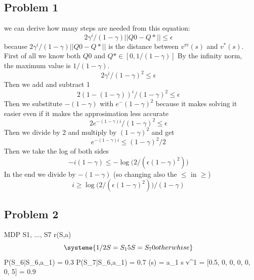 \documentclass[10pt,a4paper]{article}
\begin{document}
\subsection*{Problem 1}
we can derive how many steps are needed from this equation:
\begin{equation}  {2\gamma^i}/{(1-\gamma)}||Q0-Q*|| \leq \epsilon \end{equation}
because $ {2\gamma^i}/{(1-\gamma)}||Q0-Q*|| $ is the distance between $ v^{\pi i}(s) $ and $v^*(s) $. \newline
\newline
First of all we know both $Q0$ and $Q* \in [0, 1/(1-\gamma)]$ By the infinity norm, the maximum value is $ 1/(1-\gamma) $. 
\begin{equation}
{2\gamma^i}/{(1-\gamma)^2} \leq \epsilon
\end{equation}
Then we add and subtract 1 
\begin{equation}
    {2 (1 - (1 - \gamma))^i}/{(1-\gamma)^2} \leq \epsilon
\end{equation}
Then we substitute $ - (1 - \gamma) $ with $e^- (1 - \gamma)^2 $ because it makes solving it easier even if it makes the approsimation less accurate
\begin{equation}
    {2e^{-(1 - \gamma )i}}/{(1-\gamma)^2} \leq \epsilon
\end{equation}
Then we divide by 2 and multiply by $ {(1-\gamma)^2} $ and get 
\begin{equation}
e^{-(1 - \gamma )i} \leq  {(1-\gamma)^2}/2
\end{equation}
Then we take the log of both sides 
\begin{equation}
    -i(1 - \gamma ) \leq  -\log({2/(\epsilon(1-\gamma)^2))}
\end{equation}
In the end we divide by $ -(1 - \gamma ) $ (so changing also the $\leq$ in $\geq$)
\begin{equation}
    i \geq  \log({2/(\epsilon(1-\gamma)^2))}/(1 - \gamma ) 
\end{equation}

\newpage
\subsection*{Problem 2}
MDP \newline
S1, ..., S7
r(S,a)\begin{equation}
    \systeme{
      1/2 S = S_{1}
      5 S = S_{7}
      0 otherwhise
    }
\end{equation}
\newline
P(S_{6}|S_{6},a_{1}) = 0.3
P(S_{7}|S_{6},a_{1}) = 0.7
\newline
\pi(s) = a_{1} \forall s
v^1 = [0.5, 0, 0, 0, 0, 0, 5]
\gamma = 0.9
\end{document}
